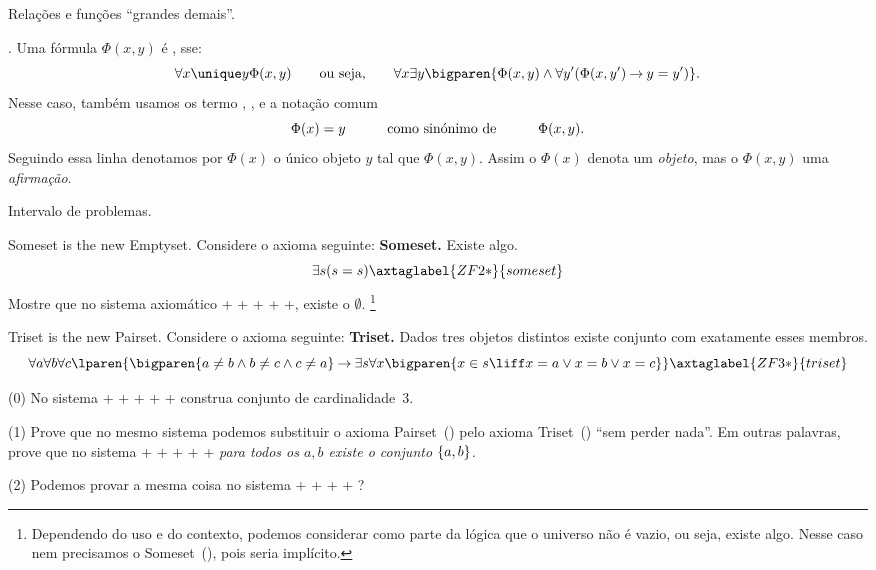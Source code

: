 \note Relações e funções ``grandes demais''.
%
%

.
\label{functionlike}%
Uma fórmula $\Phi(x,y)$ é , sse:
$$
\forall x
\unique y
\Phi(x,y)
\qquad
\text{ou seja,}
\qquad
\forall x
\exists y
\bigparen{
\Phi(x,y)
\land
\forall y'
\paren{\Phi(x,y') \limplies y = y'}}.
$$
Nesse caso, também usamos os termo , ,
e a notação comum
$$
\Phi(x) = y
\hskip 3em\relax\text{como sinónimo de}\hskip 3em\relax
\Phi(x,y).
$$
Seguindo essa linha denotamos por $\Phi(x)$ o único objeto $y$ tal que
$\Phi(x,y)$.
Assim o $\Phi(x)$ denota um \emph{objeto}, mas o $\Phi(x,y)$ uma \emph{afirmação}.

\endsection

\problems Intervalo de problemas.

\problem Someset is the new Emptyset.
\label{someset_problem}%
Considere o axioma seguinte:
\endgraf
\noindent
{\bf Someset.}
{\proclaimstyle Existe algo.}
$$
\exists s \paren{ s = s }
\axtaglabel{ZF2*}{someset}
$$
Mostre que no sistema axiomático
%
+%
+%
+%
+%
+,
existe o $\emptyset$.%
\footnote{Dependendo do uso e do contexto, podemos considerar como parte da lógica
que o universo não é vazio, ou seja, existe algo.  Nesse caso nem precisamos
o Someset~(), pois seria implícito.}

\endproblem

\problem Triset is the new Pairset.
\label{triset_problem}%
Considere o axioma seguinte:
\endgraf\noindent
{\bf Triset.}
{\proclaimstyle
Dados tres objetos distintos existe conjunto com exatamente
esses membros.
}
$$
\forall a
\forall b
\forall c
\lparen{
\bigparen{
a\neq b \land b \neq c \land c \neq a
}
\limplies
\exists s
\forall x
\bigparen{x\in s \liff x = a \lor x = b \lor x = c}
}
\axtaglabel{ZF3*}{triset}
$$
\item{(0)}
No sistema
%
+%
+%
+%
+%
+
construa conjunto de cardinalidade~$3$.
\item{(1)}
Prove que no mesmo sistema
podemos substituir o axioma Pairset~() pelo axioma
Triset~() ``sem perder nada''.
Em outras palavras, prove que no sistema
%
+%
+%
+%
+%
+
\emph{para todos os $a,b$ existe o conjunto $\left\{a,b\right\}$}.
\item{(2)}
Podemos provar a mesma coisa no sistema
%
+%
+%
+%
+%
?

